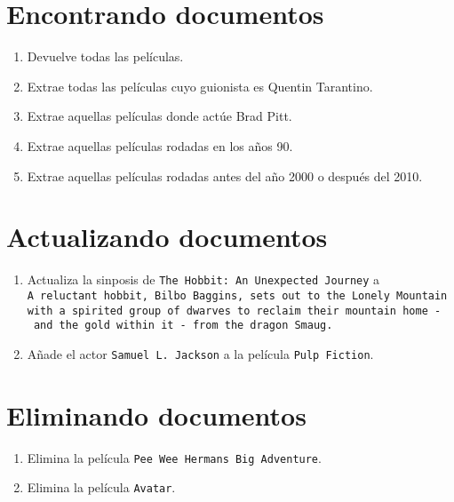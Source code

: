 \documentclass[]{article}
\providecommand{\tightlist}{%
  \setlength{\itemsep}{0pt}\setlength{\parskip}{0pt}}
\begin{document}
\hypertarget{encontrando-documentos}{%
\section{Encontrando documentos}\label{encontrando-documentos}}

\begin{enumerate}
\def\labelenumi{\arabic{enumi}.}
\tightlist
\item
  Devuelve todas las películas.
\item
  Extrae todas las películas cuyo guionista es Quentin Tarantino.
\item
  Extrae aquellas películas donde actúe Brad Pitt.
\item
  Extrae aquellas películas rodadas en los años 90.
\item
  Extrae aquellas películas rodadas antes del año 2000 o después del
  2010.
\end{enumerate}

\hypertarget{actualizando-documentos}{%
\section{Actualizando documentos}\label{actualizando-documentos}}

\begin{enumerate}
\def\labelenumi{\arabic{enumi}.}
\item
  Actualiza la sinposis de
  \texttt{The\ Hobbit:\ An\ Unexpected\ Journey} a
  \texttt{A\ reluctant\ hobbit,\ Bilbo\ Baggins,\ sets\ out\ to\ the\ Lonely\ Mountain\ with\ a\ spirited\ group\ of\ dwarves\ to\ reclaim\ their\ mountain\ home\ -\ and\ the\ gold\ within\ it\ -\ from\ the\ dragon\ Smaug.}
\item
  Añade el actor \texttt{Samuel\ L.\ Jackson} a la película
  \texttt{Pulp\ Fiction}.
\end{enumerate}

\hypertarget{eliminando-documentos}{%
\section{Eliminando documentos}\label{eliminando-documentos}}

\begin{enumerate}
\def\labelenumi{\arabic{enumi}.}
\tightlist
\item
  Elimina la película
  \texttt{Pee\ Wee\ Herman\textquotesingle{}s\ Big\ Adventure}.
\item
  Elimina la película \texttt{Avatar}.
\end{enumerate}
\end{document}
